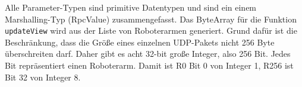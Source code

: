Alle Parameter-Typen sind primitive Datentypen und sind ein einem Marshalling-Typ (RpcValue) zusammengefasst.
Das ByteArray für die Funktion \texttt{updateView} wird aus der Liste von Roboterarmen generiert. Grund dafür ist die Beschränkung, dass die Größe eines einzelnen UDP-Pakets nicht 256 Byte überschreiten darf. Daher gibt es acht 32-bit große Integer, also 256 Bit. Jedes Bit repräsentiert einen Roboterarm. Damit ist R0 Bit 0 von Integer 1, R256 ist Bit 32 von Integer 8. 











